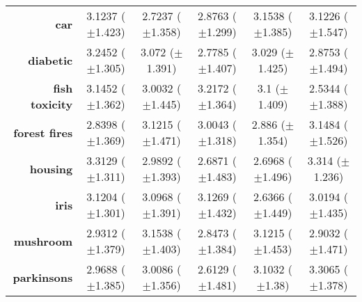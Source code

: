 \begin{table}[htbp]
{\begin{tabular}{r|ccccc}
			\textbf{car}                 & \cellcolor[rgb]{ 1,  .906,  .518}3.1237 ($\pm$1.423)    & \cellcolor[rgb]{ .388,  .745,  .482}2.7237 ($\pm$1.358) & \cellcolor[rgb]{ .62,  .812,  .494}2.8763 ($\pm$1.299)  & \cellcolor[rgb]{ .973,  .412,  .42}3.1538 ($\pm$1.385)  & \cellcolor[rgb]{ 1,  .922,  .518}3.1226 ($\pm$1.547)    \\
			\textbf{diabetic}            & \cellcolor[rgb]{ .973,  .412,  .42}3.2452 ($\pm$1.305)  & \cellcolor[rgb]{ .996,  .824,  .502}3.072 ($\pm$1.391)  & \cellcolor[rgb]{ .388,  .745,  .482}2.7785 ($\pm$1.407) & \cellcolor[rgb]{ 1,  .922,  .518}3.029 ($\pm$1.425)     & \cellcolor[rgb]{ .624,  .812,  .494}2.8753 ($\pm$1.494) \\
			\textbf{fish toxicity}       & \cellcolor[rgb]{ .992,  .725,  .482}3.1452 ($\pm$1.362) & \cellcolor[rgb]{ .894,  .89,  .51}3.0032 ($\pm$1.445)   & \cellcolor[rgb]{ .973,  .412,  .42}3.2172 ($\pm$1.364)  & \cellcolor[rgb]{ 1,  .922,  .518}3.1 ($\pm$1.409)       & \cellcolor[rgb]{ .388,  .745,  .482}2.5344 ($\pm$1.388) \\
			\textbf{forest fires}        & \cellcolor[rgb]{ .388,  .745,  .482}2.8398 ($\pm$1.369) & \cellcolor[rgb]{ .98,  .51,  .439}3.1215 ($\pm$1.471)   & \cellcolor[rgb]{ 1,  .922,  .518}3.0043 ($\pm$1.318)    & \cellcolor[rgb]{ .557,  .792,  .49}2.886 ($\pm$1.354)   & \cellcolor[rgb]{ .973,  .412,  .42}3.1484 ($\pm$1.526)  \\
			\textbf{housing}             & \cellcolor[rgb]{ .976,  .416,  .424}3.3129 ($\pm$1.311) & \cellcolor[rgb]{ 1,  .922,  .518}2.9892 ($\pm$1.393)    & \cellcolor[rgb]{ .388,  .745,  .482}2.6871 ($\pm$1.483) & \cellcolor[rgb]{ .404,  .749,  .482}2.6968 ($\pm$1.496) & \cellcolor[rgb]{ .973,  .412,  .42}3.314 ($\pm$1.236)   \\
			\textbf{iris}                & \cellcolor[rgb]{ .98,  .522,  .443}3.1204 ($\pm$1.301)  & \cellcolor[rgb]{ 1,  .922,  .518}3.0968 ($\pm$1.391)    & \cellcolor[rgb]{ .973,  .412,  .42}3.1269 ($\pm$1.432)  & \cellcolor[rgb]{ .388,  .745,  .482}2.6366 ($\pm$1.449) & \cellcolor[rgb]{ .894,  .89,  .51}3.0194 ($\pm$1.435)   \\
			\textbf{mushroom}            & \cellcolor[rgb]{ 1,  .922,  .518}2.9312 ($\pm$1.379)    & \cellcolor[rgb]{ .973,  .412,  .42}3.1538 ($\pm$1.403)  & \cellcolor[rgb]{ .388,  .745,  .482}2.8473 ($\pm$1.384) & \cellcolor[rgb]{ .98,  .486,  .435}3.1215 ($\pm$1.453)  & \cellcolor[rgb]{ .796,  .863,  .506}2.9032 ($\pm$1.471) \\
			\textbf{parkinsons}          & \cellcolor[rgb]{ .937,  .902,  .514}2.9688 ($\pm$1.385) & \cellcolor[rgb]{ 1,  .922,  .518}3.0086 ($\pm$1.356)    & \cellcolor[rgb]{ .388,  .745,  .482}2.6129 ($\pm$1.481) & \cellcolor[rgb]{ .992,  .761,  .49}3.1032 ($\pm$1.38)   & \cellcolor[rgb]{ .973,  .412,  .42}3.3065 ($\pm$1.378)  \\

\end{tabular}}
\end{table}
